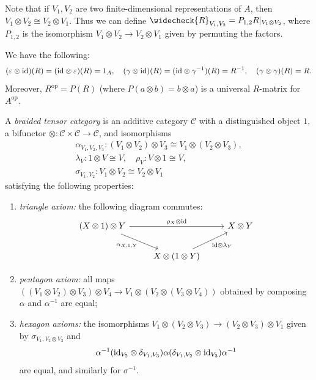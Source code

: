 \begin{remark}
  Note that if $V_1, V_2$ are
  two finite-dimensional representations of
  $A$, then
  $V_1 \otimes V_2 \cong V_2 \otimes V_1$.
  Thus we can define
  $\widecheck{R}_{V_1, V_2} = P_{1, 2} R|_{V_1 \otimes V_2}$,
  where $P_{1, 2}$ is the isomorphism
  $V_1 \otimes V_2 \to V_2 \otimes V_1$
  given by permuting the factors.
\end{remark}

\begin{prop}
  We have the following:
  \[
    (\varepsilon \otimes {\operatorname{id}})(R)
    = ({\operatorname{id}} \otimes \varepsilon)(R) = 1_A,
    \quad
    (\gamma \otimes {\operatorname{id}})(R)
    = ({\operatorname{id}} \otimes \gamma^{-1})(R) = R^{-1}, \quad
    (\gamma \otimes \gamma)(R) = R.
  \]
  Moreover, $R^{\mathrm{op}} = P(R)$
  (where $P(a \otimes b) = b \otimes a$)
  is a universal $R$-matrix for $A^{\mathrm{op}}$.
\end{prop}

\begin{definition}
  A \emph{braided tensor category}
  is an additive category
  $\mathcal{C}$ with a distinguished
  object $1$, a bifunctor
  $\otimes : \mathcal{C} \times \mathcal{C} \to \mathcal{C}$,
  and isomorphisms
  \begin{gather*}
    \alpha_{V_1, V_2, V_3}
    : (V_1 \otimes V_2) \otimes V_3
    \cong V_1 \otimes (V_2 \otimes V_3), \\
    \lambda_V : 1 \otimes V \cong V, \quad
    \rho_V : V \otimes 1 \cong V, \\
    \sigma_{V_1, V_2} : V_1 \otimes V_2 \cong V_2 \otimes V_1
  \end{gather*}
  satisfying the following properties:
  \begin{enumerate}
    \item \emph{triangle axiom:}
      the following diagram commutes:
      \[
        \begin{tikzcd}
          (X \otimes 1) \otimes Y \ar[rr, "\rho_X \otimes {\id}"]
          \ar[dr, "\alpha_{X, 1, Y}", swap]
          & & X \otimes Y \\
          & X \otimes (1 \otimes Y)
          \ar[ur, "{\id} \otimes \lambda_Y", swap]
        \end{tikzcd}
      \]
    \item \emph{pentagon axiom:}
      all maps
      $((V_1 \otimes V_2) \otimes V_3) \otimes V_4 \to V_1 \otimes (V_2 \otimes (V_3 \otimes V_4))$
      obtained by composing
      $\alpha$ and $\alpha^{-1}$ are equal;
    \item \emph{hexagon axioms:}
      the isomorphisms
      $V_1 \otimes (V_2 \otimes V_3) \to (V_2 \otimes V_3) \otimes V_1$
      given by
      $\sigma_{V_1, V_2 \otimes V_3}$ and
      \[
        \alpha^{-1}
        ({\operatorname{id}_{V_2}} \otimes \delta_{V_1, V_3})
        \alpha (\delta_{V_1, V_2} \otimes {\operatorname{id}_{V_3}}) \alpha^{-1}
      \]
      are equal, and similarly for $\sigma^{-1}$.
  \end{enumerate}
\end{definition}


